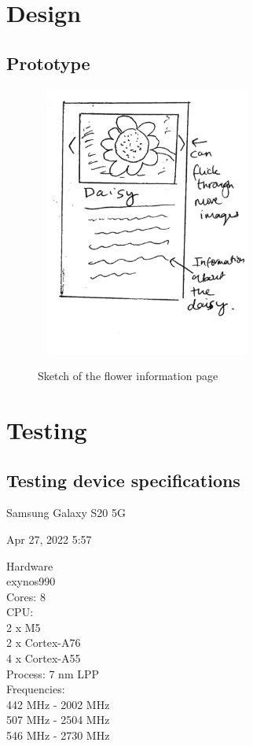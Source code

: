 \documentclass[12pt,a4paper]{report}
\begin{document}
\section{Design}

\subsection{Prototype}

\begin{figure}[h]\
    \centering
    \includegraphics[width=0.6\textwidth]{Info_Sketch.jpg}
    \caption{Sketch of the flower information page}
    \label{fig:sketch_info}
\end{figure}

\section{Testing}
\subsection{Testing device specifications}

\label{subsec:phone_spec}

Samsung Galaxy S20 5G

\par

Apr 27, 2022 5:57

\par

Hardware \\
exynos990 \\
Cores: 8 \\
CPU: \\
2 x M5 \\
2 x Cortex-A76 \\
4 x Cortex-A55 \\
Process: 7 nm LPP \\
Frequencies: \\
442 MHz - 2002 MHz \\
507 MHz - 2504 MHz \\ 
546 MHz - 2730 MHz
\end{document}

